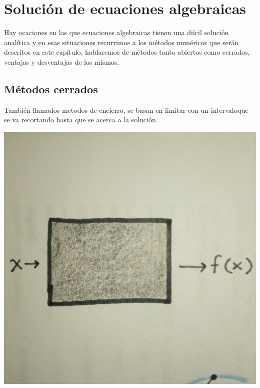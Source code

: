 \chapter{Soluci\'on de ecuaciones algebraicas}


Hay ocaciones en las que ecuaciones algebraicas tienen una di\'icil soluci\'on anal\'itica y en esas situaciones recurrimos a los m\'etodos num\'ericos que ser\'an descritos en este cap\'itulo, hablaremos de m\'etodos tanto abiertos como cerrados, ventajas y desventajas de los mismos. 

\section{M\'etodos cerrados}
Tambi\'en llamados metodos de encierro, se basan en limitar con un intervaloque se va recortando hasta que se acerca a la soluci\'on.

\begin{center}
\includegraphics[scale=.05]{imagenes/1.jpg}
\end{center}

